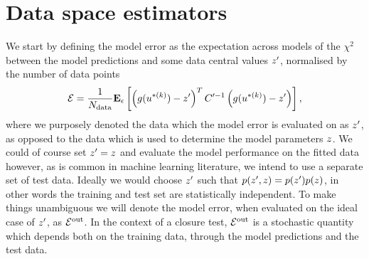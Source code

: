 \section{Data space estimators}

We start by defining the model error as the expectation across models of the
$\chi^2$ between the model predictions and some data central values
$z^\prime$, normalised by the number of data points
\begin{equation}\label{eq:chi2kerep}
    \mathcal{E} = \frac{1}{N_{\rm data}} \mathbf{E}_{\epsilon}\left[ 
        \left( g(u^{* (k)}) - z^\prime \right)^T
        C^{\prime -1}
        \left( g(u^{* (k)}) - z^\prime \right)
     \right],
\end{equation}
where we purposely denoted the data which the model error is evaluated on as
$z^\prime$, as opposed to the data which is used to determine the model
parameters $z$. We could of course set $z^\prime = z$
and evaluate the model performance on the fitted data however, as is common in
machine learning literature, we intend to use a separate set of test data.
Ideally we would choose $z^\prime$ such that
$p(z^\prime, z) = p(z^\prime)p(z)$, in other words
the training and test set are statistically independent. To make things
unambiguous we will denote the model error, when evaluated on the ideal case of
$z^\prime$, as $\mathcal{E}^{\rm out}$. In the context of a closure test, $\mathcal{E}^{\rm out}$ is
a stochastic quantity which depends both on the training data, through the model
predictions and the test data.

